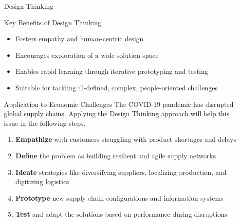 \documentclass[final]{beamer}
\begin{document}
\begin{frame}{}
\begin{columns}[t]
\begin{column}{.3\linewidth}
\begin{block}{Design Thinking}
			\end{block}
			\vspace{1cm}
			\begin{block}{Key Benefits of Design Thinking}
				\begin{itemize}
					\item Fosters empathy and human-centric design
					\item Encourages exploration of a wide solution space
					\item Enables rapid learning through iterative prototyping and testing
					\item Suitable for tackling ill-defined, complex, people-oriented challenges
				\end{itemize}
			\end{block}
			\vspace{1cm}
			\begin{block}{Application to Economic Challenges}
				The COVID-19 pandemic has disrupted global supply chains. Applying the Design Thinking approach will help this issue in the following steps.
				\begin{enumerate}
					\item \textbf{Empathize} with customers struggling with product shortages and delays
					\item \textbf{Define} the problem as building resilient and agile supply networks
					\item \textbf{Ideate} strategies like diversifying suppliers, localizing production, and digitizing logistics
					\item \textbf{Prototype} new supply chain configurations and information systems
					\item \textbf{Test} and adapt the solutions based on performance during disruptions
				\end{enumerate}
			\end{block}

		\end{column}

		\begin{column}{.35\linewidth}
			\vspace{-0.82cm}
			\begin{block}{}
				\centering
				\Large \textbf{\inserttitle}\\

				\vspace{0.8cm}

				\normalsize \insertauthor\\


\end{block}
\end{column}
\end{columns}
\end{frame}
\end{document}

